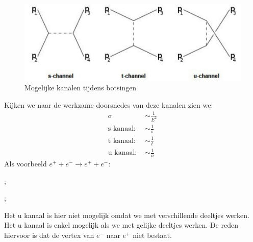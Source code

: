 \documentclass[../main.tex]{subfiles}
\begin{document}
\begin{figure}[h]
    \centering
    \includegraphics[width=0.8\linewidth]{introduction_and_review/kanalen.png}
    \caption{Mogelijke kanalen tijdens botsingen}%
    \label{fig:kanalen}
\end{figure}

Kijken we naar de werkzame doorsnedes van deze kanalen zien we:
\begin{equation}
    \begin{aligned}
        \label{eq:kanalen_doorsnede}
        \sigma&\sim\frac{1}{E^2}\\
        \text{s kanaal: }&\sim\frac{1}{s}\\
        \text{t kanaal: }&\sim\frac{1}{t}\\
        \text{u kanaal: }&\sim\frac{1}{u}
    \end{aligned}
\end{equation}
Als voorbeeld $e^+ +e^- \rightarrow e^+ + e^-$:\\
\begin{minipage}[c]{0.5\textwidth}
    \begin{center}
        ;
    \end{center}
\end{minipage}\noindent
\begin{minipage}[c]{0.5\textwidth}
    \begin{center}
        ;
    \end{center}
\end{minipage}
Het u kanaal is hier niet mogelijk omdat we met verschillende deeltjes werken. Het u kanaal is enkel mogelijk als we met gelijke deeltjes werken. De reden hiervoor is dat de vertex van $e^-$ naar $e^+$ niet bestaat.
\end{document}
